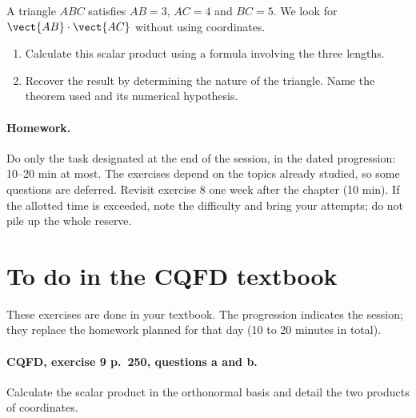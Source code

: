 A triangle $ABC$ satisfies $AB=3$, $AC=4$ and $BC=5$. We look for $\vect{AB}\cdot\vect{AC}$ without using coordinates.
\begin{enumerate}[label=\arabic*.]
\item Calculate this scalar product using a formula involving the three lengths.
\item Recover the result by determining the nature of the triangle. Name the theorem used and its numerical hypothesis.
\end{enumerate}
\paragraph{Homework.} Do only the task designated at the end of the session, in the dated progression: 10--20 min at most. The exercises depend on the topics already studied, so some questions are deferred. Revisit exercise 8 one week after the chapter (10 min). If the allotted time is exceeded, note the difficulty and bring your attempts; do not pile up the whole reserve.
\endgroup
{}\section*{To do in the CQFD textbook}
These exercises are done in your textbook. The progression indicates the session; they replace the homework planned for that day (10 to 20 minutes in total).
\paragraph{CQFD, exercise 9 p.~250, questions a and b.}\label{C03-M1} Calculate the scalar product in the orthonormal basis and detail the two products of coordinates.
